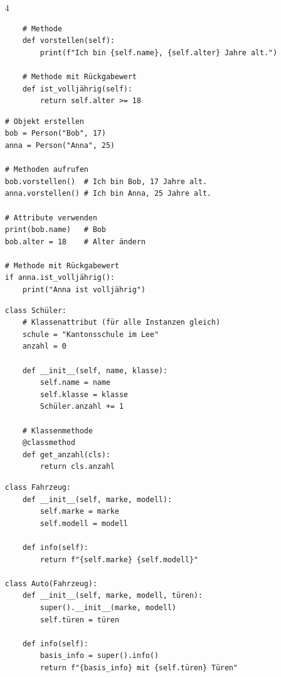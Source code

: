 \begin{landscape}
\begin{multicols*}{4}
\begin{cheatSheetBox}[title=Klassen definieren]
\begin{lstlisting}
    # Methode
    def vorstellen(self):
        print(f"Ich bin {self.name}, {self.alter} Jahre alt.")
    
    # Methode mit Rückgabewert
    def ist_volljährig(self):
        return self.alter >= 18
\end{lstlisting}
		\end{cheatSheetBox}

		\begin{cheatSheetBox}[title=Objekte erstellen und verwenden]
			\begin{lstlisting}
# Objekt erstellen
bob = Person("Bob", 17)
anna = Person("Anna", 25)

# Methoden aufrufen
bob.vorstellen()  # Ich bin Bob, 17 Jahre alt.
anna.vorstellen() # Ich bin Anna, 25 Jahre alt.

# Attribute verwenden
print(bob.name)   # Bob
bob.alter = 18    # Alter ändern

# Methode mit Rückgabewert
if anna.ist_volljährig():
    print("Anna ist volljährig")
\end{lstlisting}
		\end{cheatSheetBox}

		\begin{cheatSheetBox}[title=Klassenattribute]
			\begin{lstlisting}
class Schüler:
    # Klassenattribut (für alle Instanzen gleich)
    schule = "Kantonsschule im Lee"
    anzahl = 0
    
    def __init__(self, name, klasse):
        self.name = name
        self.klasse = klasse
        Schüler.anzahl += 1
    
    # Klassenmethode
    @classmethod
    def get_anzahl(cls):
        return cls.anzahl
\end{lstlisting}
		\end{cheatSheetBox}

		\begin{cheatSheetBox}[title=Vererbung]
			\begin{lstlisting}
class Fahrzeug:
    def __init__(self, marke, modell):
        self.marke = marke
        self.modell = modell
    
    def info(self):
        return f"{self.marke} {self.modell}"

class Auto(Fahrzeug):
    def __init__(self, marke, modell, türen):
        super().__init__(marke, modell)
        self.türen = türen
    
    def info(self):
        basis_info = super().info()
        return f"{basis_info} mit {self.türen} Türen"
\end{lstlisting}
		\end{cheatSheetBox}




	\end{multicols*}
\end{landscape}
\clearpage
\restoregeometry
